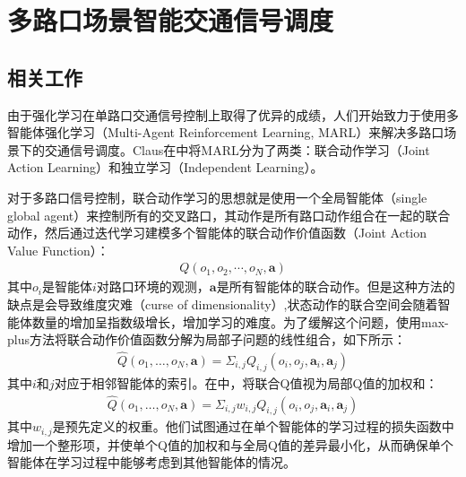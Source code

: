 
\chapter{多路口场景智能交通信号调度}

\section{相关工作}
由于强化学习在单路口交通信号控制上取得了优异的成绩，人们开始致力于使用多智能体强化学习（Multi-Agent Reinforcement Learning, MARL）来解决多路口场景下的交通信号调度。Claus在中将MARL分为了两类：联合动作学习（Joint Action Learning）和独立学习（Independent Learning）。

对于多路口信号控制，联合动作学习的思想就是使用一个全局智能体（single global agent）来控制所有的交叉路口，其动作是所有路口动作组合在一起的联合动作，然后通过迭代学习建模多个智能体的联合动作价值函数（Joint Action Value Function）：
\begin{align}
  Q(o_1, o_2, \cdots, o_N, \mathbf{a})
\end{align}
其中$o_i$是智能体$i$对路口环境的观测，$\mathbf{a}$是所有智能体的联合动作。但是这种方法的缺点是会导致维度灾难（curse of dimensionality）,状态动作的联合空间会随着智能体数量的增加呈指数级增长，增加学习的难度。为了缓解这个问题，使用max-plus方法将联合动作价值函数分解为局部子问题的线性组合，如下所示：
\begin{align}
  \hat{Q}\left(o_{1}, \ldots, o_{N}, \mathbf{a}\right)=\Sigma_{i, j} Q_{i, j}\left(o_{i}, o_{j}, \mathbf{a}_{i}, \mathbf{a}_{j}\right)
\end{align}
其中$i \text{和} j$对应于相邻智能体的索引。在中，将联合Q值视为局部Q值的加权和：
\begin{align}
  \hat{Q}\left(o_{1}, \ldots, o_{N}, \mathbf{a}\right)=\Sigma_{i, j} w_{i, j} Q_{i, j}\left(o_{i}, o_{j}, \mathbf{a}_{i}, \mathbf{a}_{j}\right)
\end{align}
其中$w_{i,j}$是预先定义的权重。他们试图通过在单个智能体的学习过程的损失函数中增加一个整形项，并使单个Q值的加权和与全局Q值的差异最小化，从而确保单个智能体在学习过程中能够考虑到其他智能体的情况。

